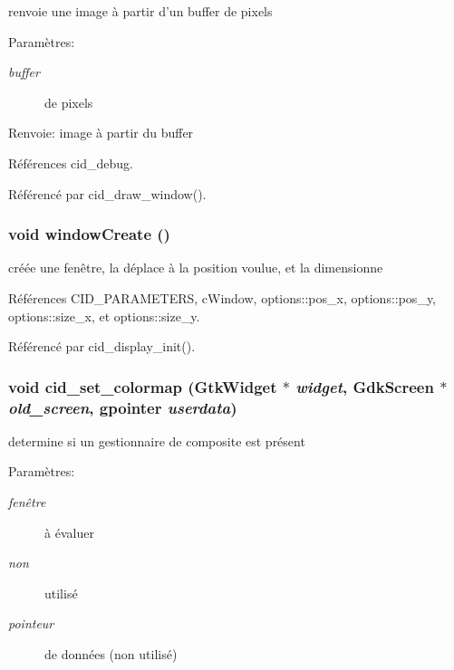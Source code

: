 renvoie une image à partir d'un buffer de pixels \begin{Desc}
\item[Paramètres:]
\begin{description}
\item[{\em buffer}]de pixels \end{description}
\end{Desc}
\begin{Desc}
\item[Renvoie:]image à partir du buffer \end{Desc}


Références cid\_\-debug.

Référencé par cid\_\-draw\_\-window().
\subsubsection{\setlength{\rightskip}{0pt plus 5cm}void windowCreate ()}\label{cid-gtk_8c_9b1cec11c1e104c0c8a1c96af4970c3c}


créée une fenêtre, la déplace à la position voulue, et la dimensionne 

Références CID\_\-PARAMETERS, cWindow, options::pos\_\-x, options::pos\_\-y, options::size\_\-x, et options::size\_\-y.

Référencé par cid\_\-display\_\-init().
\subsubsection{\setlength{\rightskip}{0pt plus 5cm}void cid\_\-set\_\-colormap (GtkWidget $\ast$ {\em widget}, \/  GdkScreen $\ast$ {\em old\_\-screen}, \/  gpointer {\em userdata})}\label{cid-gtk_8c_2839de6472a3afc45911b4856e156443}


determine si un gestionnaire de composite est présent \begin{Desc}
\item[Paramètres:]
\begin{description}
\item[{\em fenêtre}]à évaluer \item[{\em non}]utilisé \item[{\em pointeur}]de données (non utilisé) \end{description}
\end{Desc}


